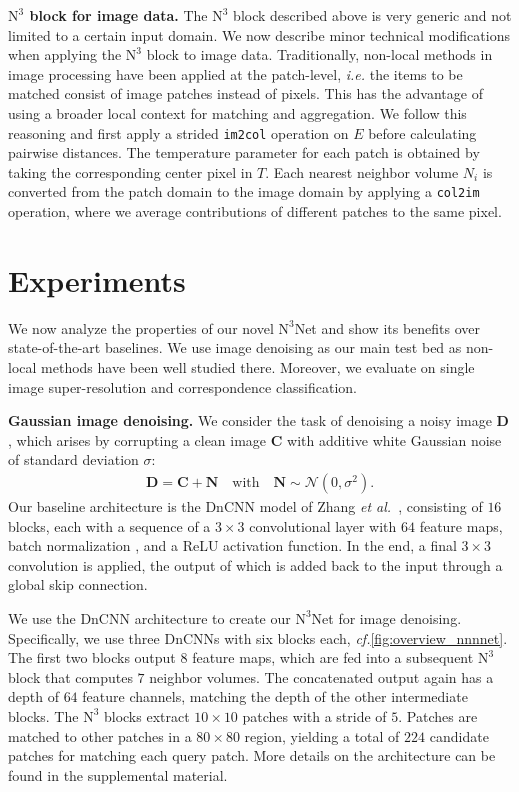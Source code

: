\documentclass{article}
\makeatletter
\newcommand{\ie}{\emph{i.\thinspace{}e.}\@\xspace}
\newcommand{\cf}{\emph{cf.}\@\xspace}
\newcommand{\etal}{\emph{et al.}\@\xspace}
\newcommand{\mv}[1]{\ensuremath{\mathbf{#1}}}
\newcommand{\mm}[1]{\ensuremath{\mathbf{#1}}}
\newcommand\Gaussian{\mathcal{N}}
\newcommand{\myparagraph}[1]{\smallskip\noindent\textbf{#1}}
\newcommand\Tcat{T}
\newcommand\nnn{\text{N}^3}
\makeatother
\begin{document}
\myparagraph{$\nnn$ block for image data.}
The $\nnn$ block described above is very generic and not limited to a certain input domain. 
We now describe minor technical modifications when applying the $\nnn$ block to image data. 
Traditionally, non-local methods in image processing have been applied at the patch-level, \ie the items to be matched consist of image patches instead of pixels. 
This has the advantage of using a broader local context for matching and aggregation.
We follow this reasoning and first apply a strided \texttt{im2col} operation on $E$ before calculating pairwise distances.
The temperature parameter for each patch is obtained by taking the corresponding center pixel in $\Tcat$.
Each nearest neighbor volume $N_i$ is converted from the patch domain to the image domain by applying a \texttt{col2im} operation, where we average contributions of different patches to the same pixel.

 
\section{Experiments}
\label{sec:experiments}
We now analyze the properties of our novel $\nnn$Net and show its benefits over state-of-the-art baselines.
We use image denoising as our main test bed as non-local methods have been well studied there.
Moreover, we evaluate on single image super-resolution and correspondence classification.

\myparagraph{Gaussian image denoising.}
We consider the task of denoising a noisy image $\mm{D}$, which arises
by corrupting a clean image $\mm{C}$ with additive white Gaussian noise of standard deviation $\sigma$:
\begin{align}
\mm{D} = \mm{C} + \mv{N} \quad\text{with}\quad \mv{N}\sim\Gaussian(0,\sigma^2).
\end{align}
Our baseline architecture is the DnCNN model of Zhang \etal~\cite{Zhang:2017:BGD},
consisting of $16$ blocks, each with a sequence of a $3\times3$ convolutional layer with $64$ feature maps, batch normalization \cite{Ioffe:2015:BNA}, and a ReLU activation function.
In the end, a final $3\times3$ convolution is applied, the output of which is 
added back to the input through a global skip connection.

We use the DnCNN architecture to create our $\nnn$Net for image denoising.
Specifically, we use three DnCNNs with six blocks each, \cf \cref{fig:overview_nnnnet}. 
The first two blocks output $8$ feature maps, which are fed into a subsequent $\nnn$ block that computes $7$ neighbor volumes.
The concatenated output again has a depth of $64$ feature channels, matching the depth of the other intermediate blocks.
The $\nnn$ blocks extract $10\times10$ patches with a stride of $5$.
Patches are matched to other patches in a $80\times80$ region, yielding a total of $224$ candidate patches for matching each query patch. More details on the architecture can be found in the supplemental material.
\end{document}

